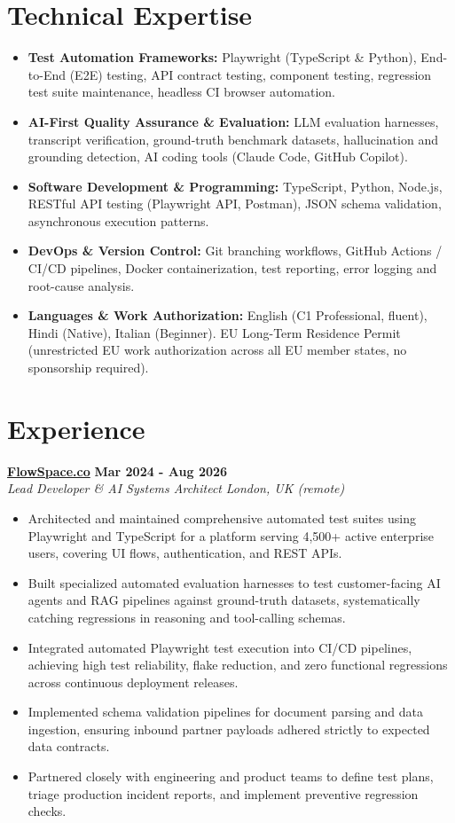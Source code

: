 \documentclass[10pt,a4paper]{article}
\newcommand{\role}[4]{%
  \textbf{#1} \hfill \textbf{#2}\\[1pt]%
  \textit{#3} \hfill \textit{#4}\\[2pt]%
}
\begin{document}
\section{Technical Expertise}
\begin{itemize}
  \item \textbf{Test Automation Frameworks:} Playwright (TypeScript \& Python), End-to-End (E2E) testing, API contract testing, component testing, regression test suite maintenance, headless CI browser automation.
  \item \textbf{AI-First Quality Assurance \& Evaluation:} LLM evaluation harnesses, transcript verification, ground-truth benchmark datasets, hallucination and grounding detection, AI coding tools (Claude Code, GitHub Copilot).
  \item \textbf{Software Development \& Programming:} TypeScript, Python, Node.js, RESTful API testing (Playwright API, Postman), JSON schema validation, asynchronous execution patterns.
  \item \textbf{DevOps \& Version Control:} Git branching workflows, GitHub Actions / CI/CD pipelines, Docker containerization, test reporting, error logging and root-cause analysis.
  \item \textbf{Languages \& Work Authorization:} English (C1 Professional, fluent), Hindi (Native), Italian (Beginner). EU Long-Term Residence Permit (unrestricted EU work authorization across all EU member states, no sponsorship required).
\end{itemize}

\section{Experience}

\role{\href{https://flowspace.co}{FlowSpace.co}}{Mar 2024 - Aug 2026}{Lead Developer \& AI Systems Architect}{London, UK (remote)}
\begin{itemize}
  \item Architected and maintained comprehensive automated test suites using Playwright and TypeScript for a platform serving 4,500+ active enterprise users, covering UI flows, authentication, and REST APIs.
  \item Built specialized automated evaluation harnesses to test customer-facing AI agents and RAG pipelines against ground-truth datasets, systematically catching regressions in reasoning and tool-calling schemas.
  \item Integrated automated Playwright test execution into CI/CD pipelines, achieving high test reliability, flake reduction, and zero functional regressions across continuous deployment releases.
  \item Implemented schema validation pipelines for document parsing and data ingestion, ensuring inbound partner payloads adhered strictly to expected data contracts.
  \item Partnered closely with engineering and product teams to define test plans, triage production incident reports, and implement preventive regression checks.
\end{itemize}
\end{document}
